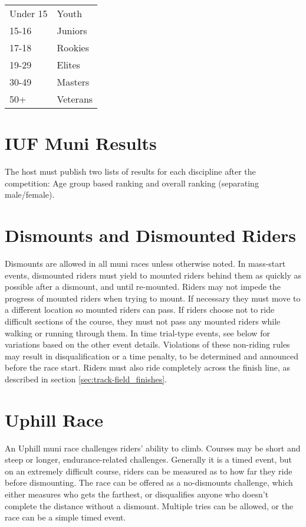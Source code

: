 \begin{tabular}{ l l}
Under 15 & Youth \\
15-16 & Juniors \\
17-18 & Rookies \\
19-29 & Elites \\
30-49 & Masters \\
50+ & Veterans \\
\end{tabular}

\section{IUF Muni Results}
The host must publish two lists of results for each discipline after the competition: Age group based ranking and overall ranking (separating
male/female).

\section{Dismounts and Dismounted Riders}
Dismounts are allowed in all muni races unless otherwise noted.
In mass-start events, dismounted riders must yield to mounted riders behind them as quickly as possible after a dismount, and until re-mounted.
Riders may not impede the progress of mounted riders when trying to mount.
If necessary they must move to a different location so mounted riders can pass.
If riders choose not to ride difficult sections of the course, they must not pass any mounted riders while walking or running through them.
In time trial-type events, see below for variations based on the other event details.
Violations of these non-riding rules may result in disqualification or a time penalty, to be determined and announced before the race start.
Riders must also ride completely across the finish line, as described in section \ref{sec:track-field_finishes}.

\section{Uphill Race \label{sec:muni_uphill}}
An Uphill muni race challenges riders' ability to climb.
Courses may be short and steep or longer, endurance-related challenges.
Generally it is a timed event, but on an extremely difficult course, riders can be measured as to how far they ride before dismounting.
The race can be offered as a no-dismounts challenge, which either measures who gets the farthest, or disqualifies anyone who doesn't complete the distance without a dismount.
Multiple tries can be allowed, or the race can be a simple timed event.

